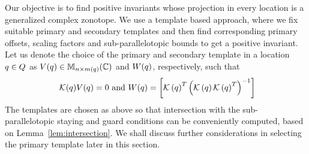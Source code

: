 
Our objective is to find positive invariants whose projection in every
location is a generalized complex zonotope.  We use a template based
approach, where we fix suitable primary and secondary templates and
then find corresponding primary offsets, scaling factors and
sub-parallelotopic bounds to get a positive invariant.  Let us denote
the choice of the primary and secondary template in a location
$q\in Q$ as $V(q)\in\mathbb{M}_{n\times m(q)}(\mathbb{\mathbb{C}})$ and
$W(q)$, respectively, such that
\begin{equation}~\label{eqn:tempselect}
\mathcal{K}(q)V(q) = 0~\text{and}~
W(q)=\left[\mathcal{K}\left(q\right)^T\left(\mathcal{K}\left(q\right)\mathcal{K}\left(q\right)^T\right)^{-1}\right]
\end{equation}  
The templates are chosen as above so that intersection with the
sub-parallelotopic staying and guard conditions can be conveniently
computed, based on Lemma~\ref{lem:intersection}.  We shall discuss
further considerations in selecting the primary template later in this
section.


